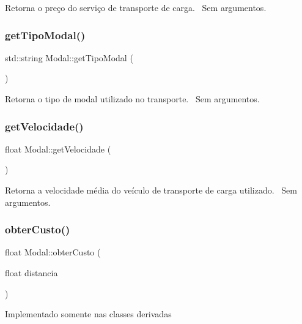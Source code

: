 Retorna o preço do serviço de transporte de carga.~\newline
Sem argumentos.\mbox{\label{classModal_ad0e185312cd36ad83b4e19fd1cd532be}} 
\subsubsection{\texorpdfstring{get\+Tipo\+Modal()}{getTipoModal()}}
{\footnotesize\ttfamily std\+::string Modal\+::get\+Tipo\+Modal (\begin{DoxyParamCaption}{ }\end{DoxyParamCaption})}

Retorna o tipo de modal utilizado no transporte.~\newline
Sem argumentos.\mbox{\label{classModal_acac9a4b13c4596842253e25f84872b32}} 
\subsubsection{\texorpdfstring{get\+Velocidade()}{getVelocidade()}}
{\footnotesize\ttfamily float Modal\+::get\+Velocidade (\begin{DoxyParamCaption}{ }\end{DoxyParamCaption})}

Retorna a velocidade média do veículo de transporte de carga utilizado.~\newline
Sem argumentos.\mbox{\label{classModal_a20cee7247cce33806d681e1d60347cc5}} 
\subsubsection{\texorpdfstring{obter\+Custo()}{obterCusto()}}
{\footnotesize\ttfamily float Modal\+::obter\+Custo (\begin{DoxyParamCaption}\item[{float}]{distancia }\end{DoxyParamCaption})\hspace{0.3cm}{\ttfamily [virtual]}}

Implementado somente nas classes derivadas

